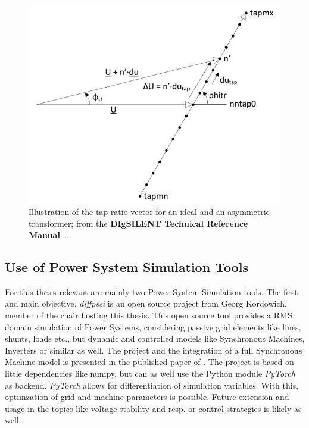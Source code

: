 \begin{figure}[htb!]
        \centering
        \includegraphics[width=.7\linewidth]{images/modeling/asymetric_ratio_vector.png}
        \caption[Illustration of the tap ratio vector for an ideal and an asymmetric transformer]{Illustration of the tap ratio vector for an ideal and an asymmetric transformer; from the \textcolor{ees_red}{\textbf{DIgSILENT Technical Reference Manual}} \dots \quelle}
        \label{fig:asymetric-ratio-vector}
\end{figure}

\subsection{Use of Power System Simulation Tools}
\label{sec:simulation-tools}

For this thesis relevant are mainly two Power System Simulation tools.
The first and main objective, \textit{diffpssi} is an open source project from Georg Kordowich, member of the chair hosting this thesis.
This open source tool provides a \acs{RMS} domain simulation of Power Systems, considering passive grid elements like lines, shunts, loads etc., but dynamic and controlled models like Synchronous Machines, Inverters or similar as well.
The project and the integration of a full Synchronous Machine model is presented in the published paper of \textcite{kordowich_2023}.
The project is based on little dependencies like numpy, but can as well use the Python module \textit{PyTorch} as backend.
\textit{PyTorch} allows for differentiation of simulation variables.
With this, optimzation of grid and machine parameters is possible.
Future extension and usage in the topics like voltage stability and resp. or control strategies is likely as well.

